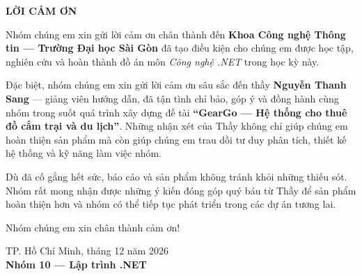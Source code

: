 \thispagestyle{empty}

\begin{center}
{\Large\textbf{LỜI CẢM ƠN}}\\[1cm]
\end{center}

\vspace{0.5cm}

Nhóm chúng em xin gửi lời cảm ơn chân thành đến \textbf{Khoa Công nghệ Thông tin --- Trường Đại học Sài Gòn} đã tạo điều kiện cho chúng em được học tập, nghiên cứu và hoàn thành đồ án môn \textit{Công nghệ .NET} trong học kỳ này.

Đặc biệt, nhóm chúng em xin gửi lời cảm ơn sâu sắc đến thầy \textbf{Nguyễn Thanh Sang} --- giảng viên hướng dẫn, đã tận tình chỉ bảo, góp ý và đồng hành cùng nhóm trong suốt quá trình xây dựng đề tài \textbf{``GearGo --- Hệ thống cho thuê đồ cắm trại và du lịch''}. Những nhận xét của Thầy không chỉ giúp chúng em hoàn thiện sản phẩm mà còn giúp chúng em trau dồi tư duy phân tích, thiết kế hệ thống và kỹ năng làm việc nhóm.

Dù đã cố gắng hết sức, báo cáo và sản phẩm không tránh khỏi những thiếu sót. Nhóm rất mong nhận được những ý kiến đóng góp quý báu từ Thầy để sản phẩm hoàn thiện hơn và nhóm có thể tiếp tục phát triển trong các dự án tương lai.

Nhóm chúng em xin chân thành cảm ơn!

\vspace{2cm}

\begin{flushright}
TP. Hồ Chí Minh, tháng 12 năm 2026\\[0.3cm]
\textbf{Nhóm 10 --- Lập trình .NET}
\end{flushright}
